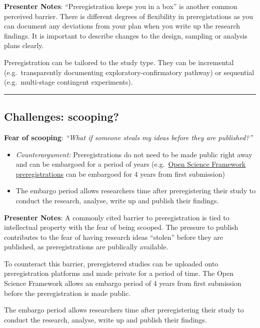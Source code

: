 \documentclass[
  letterpaper,
  DIV=11,
  numbers=noendperiod]{scrartcl}
\begin{document}
\textbf{Presenter Notes}: ``Preregistration keeps you in a box'' is
another common perceived barrier. There is different degrees of
flexibility in preregistations as you can document any deviations from
your plan when you write up the research findings. It is important to
describe changes to the design, sampling or analysis plans clearly.

Preregistration can be tailored to the study type. They can be
incremental (e.g.~transparently documenting exploratory-confirmatory
pathway) or sequential (e.g.~multi-stage contingent experiments).

\begin{center}\rule{0.5\linewidth}{0.5pt}\end{center}

\subsection{Challenges: scooping?}\label{challenges-scooping}

\textbf{Fear of scooping}: \emph{``What if someone steals my ideas
before they are published?''}

\begin{itemize}
\item
  \emph{Counterargument:} Preregistrations do not need to be made public
  right away and can be embargoed for a period of years
  (e.g.~\href{https://help.osf.io/article/634-addressing-fear-of-scooping-on-osf-preregistrations}{Open
  Science Framework preregistrations} can be embargoed for 4 years from
  first submission)
\item
  The embargo period allows researchers time after preregistering their
  study to conduct the research, analyse, write up and publish their
  findings.
\end{itemize}

\textbf{Presenter Notes}: A commonly cited barrier to preregistration is
tied to intellectual property with the fear of being scooped. The
pressure to publish contributes to the fear of having research ideas
``stolen'' before they are published, as preregistrations are publically
available.

To counteract this barrier, preregistered studies can be uploaded onto
preregistration platforms and made private for a period of time. The
Open Science Framework allows an embargo period of 4 years from first
submission before the preregistration is made public.

The embargo period allows researchers time after preregistering their
study to conduct the research, analyse, write up and publish their
findings.
\end{document}
